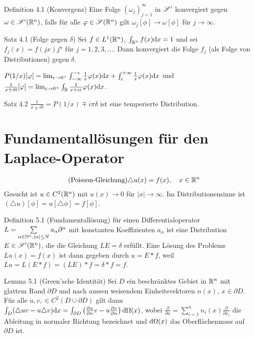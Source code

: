 \begin{namedtheorem}{Definition 4.1 (Konvergenz)}
  Eine Folge $(\omega_j)_{j=1}^{\infty}$ in $\mathscr{S}'$ konvergiert gegen $\omega\in\mathscr{S}'(\mathbb{R}^n)$, falls für alle $\varphi\in\mathscr{S}(\mathbb{R}^n)$ gilt $\omega_j[\phi] \rightarrow \omega[\phi]$ für $j\rightarrow\infty$.
\end{namedtheorem}

\begin{namedtheorem}{Satz 4.1 (Folge gegen $\delta$)}
  Sei $f\in L^1(\mathbb{R}^n)$, $\int_{\mathbb{R}^n}f(x)\mathrm{d} x = 1$ und sei $f_j(x) = f(jx)j^n$ für $j=1,2,3,\ldots$. Dann konvergiert die Folge $f_j$ (als Folge von Distributionen) gegen $\delta$.
\end{namedtheorem}

$P(1/x)[\varphi]=\lim_{\varepsilon\rightarrow0^{+}}\int_{-\infty}^{-\varepsilon}\frac1x\varphi(x)\mathrm{d}x +\int^{+\infty}_{\varepsilon}\frac1x\varphi(x)\mathrm{d}x$ und $\frac1{x\pm i0}[\varphi]=\lim_{\varepsilon\rightarrow0^{+}}\int_{\mathbb{R}}\frac1{x+i\varepsilon}\varphi(x)\mathrm{d}x$.

\begin{namedtheorem}{Satz 4.2}
  $\frac1{x\pm i0} = P(1/x)\mp i\pi\delta$ ist eine temperierte Distribution.
\end{namedtheorem}

\section{Fundamentallösungen für den Laplace-Operator}

\begin{align*}
  \tag{Poisson-Gleichung}
  \triangle u(x)=f(x), \quad x\in\mathbb{R}^n
\end{align*}
Gesucht ist $u\in C^2(\mathbb{R}^n)$ mit $u(x)\rightarrow0$ für $|x|\rightarrow\infty$. Im Distributionensinne ist $(\triangle u)[\phi]=u[\triangle \phi]=f[\phi]$.

\begin{namedtheorem}{Definition 5.1 (Fundamentallösung)} 
  für einen Differentialoperator $L=\sum\limits_{\alpha\in\mathbb{N}^n , |\alpha|\leq N} a_{\alpha} \partial^{\alpha}$ mit konstanten Koeffizienten $a_{\alpha}$ ist eine Distribution $E\in\mathscr{S}'(\mathbb{R}^n)$, die die Gleichung $LE=\delta$ erfüllt. Eine Lösung des Problems $Lu(x)=f(x)$ ist dann gegeben durch $u=E\ast f$, weil $Lu=L(E\ast f) = (LE)\ast f = \delta\ast f = f$.
\end{namedtheorem}

\begin{namedtheorem}{Lemma 5.1 (Green'sche Identität)}
  Sei $D$ ein beschränktes Gebiet in $\mathbb{R}^n$ mit glattem Rand $\partial D$ und nach aussen weisendem Einheitsvektoren $n(x)$, $x\in\partial D$. Für alle $u,v,\in C^2(D\cup\partial D)$ gilt dann $\int_D (\triangle uv - u\triangle v)\mathrm{d} x = \int_{\partial D} \left(\frac{\partial u}{\partial n} v - u\frac{\partial v}{\partial n} \right) \mathrm{d} \Omega(x)$, wobei $\frac{\partial}{\partial n} = \sum_{i=1}^n n_i(x)\frac{\partial}{\partial x_i}$ die Ableitung in normaler Richtung bezeichnet und $\mathrm{d} \Omega(x)$ das Oberflächenmass auf $\partial D$ ist.
\end{namedtheorem}

